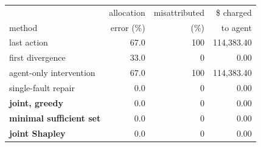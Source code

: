 \begin{tabular}{lrrr}
\toprule
& allocation & misattributed & \$ charged \\
method & error (\%) & (\%) & to agent \\
\midrule
last action & 67.0 & 100 & 114,383.40 \\
first divergence & 33.0 & 0 & 0.00 \\
agent-only intervention & 67.0 & 100 & 114,383.40 \\
single-fault repair & 0.0 & 0 & 0.00 \\
\bfseries joint, greedy & 0.0 & 0 & 0.00 \\
\bfseries minimal sufficient set & 0.0 & 0 & 0.00 \\
\bfseries joint Shapley & 0.0 & 0 & 0.00 \\
\bottomrule
\end{tabular}